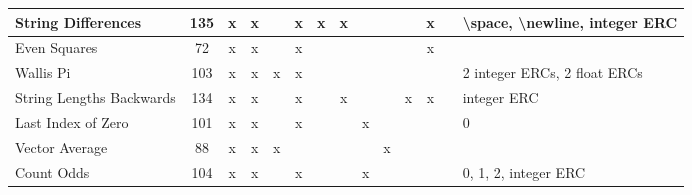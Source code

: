 \documentclass{sig-alternate}
\begin{document}
\begin{table*}[t]
\begin{tabular}{|>{\raggedright}p{3.1cm}|c|ccccccccccc|>{\raggedright}p{5.5cm}|}
\hline
String Differences         & 135             & x    & x       &       & x       & x    & x      &                    &                  &                   & x     &            & \textbackslash space, \textbackslash newline, integer ERC                                                                                                                                                                   \tabularnewline
\hline
Even Squares               & 72              & x    & x       &       & x       &      &        &                    &                  &                   & x     &            &                                                                                                                                                                                                                             \tabularnewline
\hline
Wallis Pi                  & 103             & x    & x       & x     & x       &      &        &                    &                  &                   &       &            & 2 integer ERCs, 2 float ERCs                                                                                                                                                                                                \tabularnewline
\hline
String Lengths Backwards   & 134             & x    & x       &       & x       &      & x      &                    &                  & x                 & x     &            & integer ERC                                                                                                                                                                                                                 \tabularnewline
\hline
Last Index of Zero         & 101             & x    & x       &       & x       &      &        & x                  &                  &                   &       &            & 0                                                                                                                                                                                                                           \tabularnewline
\hline
Vector Average             & 88              & x    & x       & x     &         &      &        &                    & x                &                   &       &            &                                                                                                                                                                                                                             \tabularnewline
\hline
Count Odds                 & 104             & x    & x       &       & x       &      &        & x                  &                  &                   &       &            & 0, 1, 2, integer ERC                                                                                                                                                                                                        \tabularnewline

\end{tabular}
\end{table*}
\end{document}
